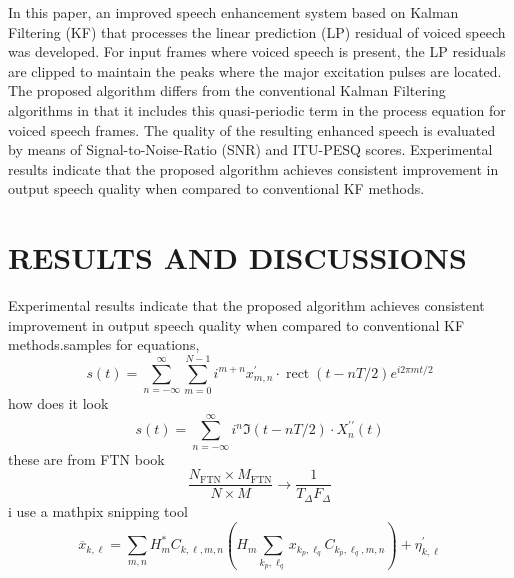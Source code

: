 \documentclass[a4paper,12pt]{report} %
\begin{document}
\begin{enumerate}[listparindent=10mm]
In this paper, an improved speech enhancement system based on Kalman Filtering (KF) that processes the linear prediction (LP) residual of voiced speech was developed. For input frames where voiced speech is present, the LP residuals are clipped to maintain the peaks where the major excitation pulses are located. The proposed algorithm differs from the conventional Kalman Filtering algorithms in that it includes this quasi-periodic term in the process equation for voiced speech frames. The quality of the resulting enhanced speech is evaluated by means of Signal-to-Noise-Ratio (SNR) and ITU-PESQ scores. Experimental results indicate that the proposed algorithm achieves consistent improvement in output speech quality when compared to conventional KF methods.
\end{enumerate}

\chapter{RESULTS AND DISCUSSIONS}

Experimental results indicate that the proposed algorithm achieves consistent improvement in output speech quality when compared to conventional KF methods.samples for equations,
\begin{equation}
s(t)=\sum_{n=-\infty}^{\infty} \sum_{m=0}^{N-1} i^{m+n} x_{m, n}^{\prime} \cdot \operatorname{rect}(t-n T / 2) e^{i 2 \pi m t / 2}
\end{equation}
how does it look
\begin{equation}
s(t)=\sum_{n=-\infty}^{\infty} i^{n} \Im(t-n T / 2) \cdot X_{n}^{\prime \prime}(t)
\end{equation}
these are from FTN book
\begin{equation}
\frac{N_{\mathrm{FTN}} \times M_{\mathrm{FTN}}}{N \times M} \rightarrow \frac{1}{T_{\Delta} F_{\Delta}}
\end{equation}
i use a mathpix snipping tool 
\begin{equation}
\overline{x}_{k, \ell}=\sum_{m, n} H_{m}^{*} C_{k, \ell, m, n}\left(H_{m} \sum_{k_{p}, \ell_{q}} x_{k_{p}, \ell_{q}} C_{k_{p}, \ell_{q}, m, n}\right)+\eta_{k, \ell}^{\prime}
\end{equation}



\end{document}
